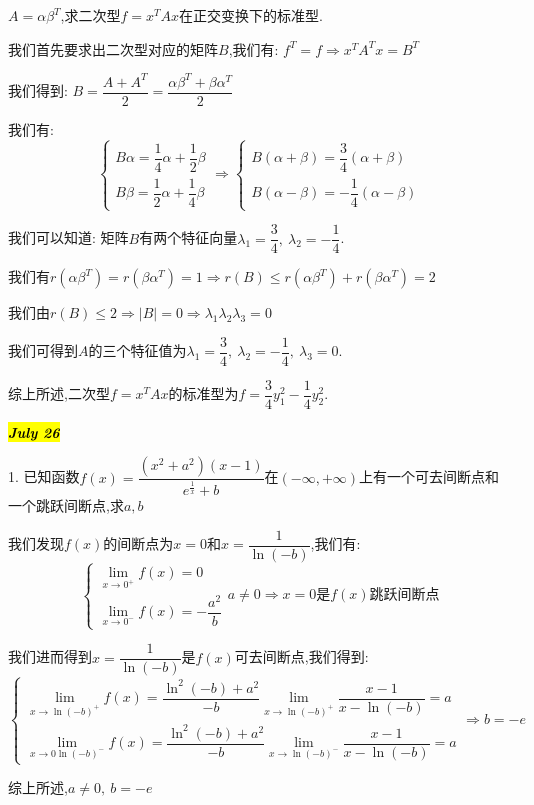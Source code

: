 \begin{anymark}[变式]
	$A=\alpha\beta^{T}$,求二次型$f=x^{T}Ax$在正交变换下的标准型.
	\begin{solution}
		
		我们首先要求出二次型对应的矩阵$B$,我们有: $f^{T}=f\Rightarrow x^{T}A^{T}x=B^{T}$
		
		我们得到: $B=\dfrac{A+A^{T}}{2}=\dfrac{\alpha\beta^{T}+\beta\alpha^{T}}{2}$
		
		我们有: 
		$$\left\lbrace
		\begin{array}{l}
			B\alpha=\dfrac{1}{4}\alpha+\dfrac{1}{2}\beta\\
			B\beta=\dfrac{1}{2}\alpha+\dfrac{1}{4}\beta
		\end{array}
		\right. \Rightarrow \left\lbrace
		\begin{array}{l}
			B(\alpha+\beta)=\dfrac{3}{4}(\alpha+\beta)\\
			B(\alpha-\beta)=-\dfrac{1}{4}(\alpha-\beta)
		\end{array}
		\right.$$
		
		我们可以知道: 矩阵$B$有两个特征向量$\lambda_{1}=\dfrac{3}{4},\ \lambda_{2}=-\dfrac{1}{4}$.
		
		我们有$r(\alpha\beta^{T})=r(\beta\alpha^{T})=1\Rightarrow r(B)\leq r(\alpha\beta^{T})+r(\beta\alpha^{T})=2$
		
		我们由$r(B)\leq 2\Rightarrow |B|=0\Rightarrow \lambda_{1}\lambda_{2}\lambda_{3}=0$
		
		我们可得到$A$的三个特征值为$\lambda_{1}=\dfrac{3}{4},\ \lambda_{2}=-\dfrac{1}{4},\ \lambda_{3}=0$.
		
		综上所述,二次型$f=x^{T}Ax$的标准型为$f=\dfrac{3}{4}y_{1}^2-\dfrac{1}{4}y_{2}^{2}$.
	\end{solution}
\end{anymark}
\hl{\textbf{\textit{July 26}}}

1. 已知函数$f(x)=\dfrac{(x^2+a^2)(x-1)}{e^{\frac{1}{x}}+b}$在$(-\infty,+\infty)$上有一个可去间断点和一个跳跃间断点,求$a,b$
\begin{solution}
	
	我们发现$f(x)$的间断点为$x=0$和$x=\dfrac{1}{\ln(-b)}$,我们有: 
	$$\left\lbrace
	\begin{array}{l}
		\lim\limits_{x\rightarrow 0^{+}}f(x)=0\\
		\lim\limits_{x\rightarrow 0^{-}}f(x)=-\dfrac{a^2}{b}
	\end{array}
	\right. a\neq 0\Rightarrow x=0\text{是}f(x)\text{跳跃间断点}$$
	
	我们进而得到$x=\dfrac{1}{\ln(-b)}$是$f(x)$可去间断点,我们得到: 
	$$\left\lbrace
	\begin{array}{l}
		\lim\limits_{x\rightarrow \ln(-b)^{+}}f(x)=\dfrac{\ln^2(-b)+a^2}{-b}\lim\limits_{x\rightarrow \ln(-b)^{+}}\dfrac{x-1}{x-\ln(-b)}=a\\
		\lim\limits_{x\rightarrow 0\ln(-b)^{-}}f(x)=\dfrac{\ln^2(-b)+a^2}{-b}\lim\limits_{x\rightarrow \ln(-b)^{-}}\dfrac{x-1}{x-\ln(-b)}=a
	\end{array}
	\right. \Rightarrow b=-e$$
	
	综上所述,$a\neq 0,\ b=-e$
\end{solution}


